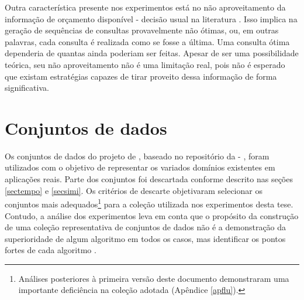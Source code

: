 Outra característica presente nos experimentos está no não aproveitamento da informação de orçamento disponível - decisão usual na literatura \cite{conf/icml/RoyM01}.
Isso implica na geração de sequências de consultas provavelmente não ótimas, ou, em outras palavras, cada consulta é realizada como se fosse a última.
Uma consulta ótima dependeria de quantas ainda poderiam ser feitas.
Apesar de ser uma possibilidade teórica, seu não aproveitamento não é uma limitação real, pois não é esperado que existam estratégias capazes de tirar proveito dessa informação de forma significativa.

\section{Conjuntos de dados}\label{desccon}
Os conjuntos de dados do projeto de , baseado no repositório da  - \cite{bache2013uci}, foram utilizados com o objetivo de representar os variados domínios existentes em aplicações reais.
Parte dos conjuntos foi descartada conforme descrito nas seções \ref{sectempo} e \ref{secsimi}.
Os critérios de descarte objetivaram selecionar os conjuntos mais adequados\footnote{Análises posteriores à primeira versão deste documento demonstraram uma importante deficiência na coleção adotada (Apêndice \ref{apflu}).} para a coleção utilizada nos experimentos desta tese.
Contudo, a análise dos experimentos leva em conta que o propósito da construção de uma coleção representativa de conjuntos de dados não é a demonstração da superioridade de algum algoritmo em todos os casos, mas identificar os pontos fortes de cada algoritmo  \cite{books/cu/Japkowicz2011}.

